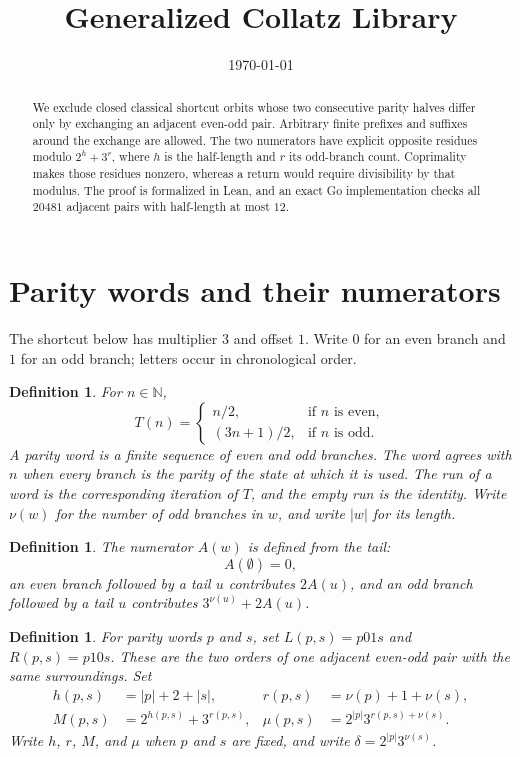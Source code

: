 \documentclass[11pt,letterpaper]{article}
\title{Generalized Collatz Library}
\author{}
\date{\today}
\newcommand{\N}{\mathbb{N}}
\newtheorem{definition}[theorem]{Definition}
\begin{document}
\maketitle

\begin{abstract}
We exclude closed classical shortcut orbits whose two consecutive parity
halves differ only by exchanging an adjacent even-odd pair. Arbitrary finite
prefixes and suffixes around the exchange are allowed. The two numerators
have explicit opposite residues modulo \(2^h+3^r\), where \(h\) is the
half-length and \(r\) its odd-branch count. Coprimality makes those residues
nonzero, whereas a return would require divisibility by that modulus. The
proof is formalized in Lean, and an exact Go implementation checks all
\(20481\) adjacent pairs with half-length at most \(12\).
\end{abstract}

\section{Parity words and their numerators}

The shortcut below has multiplier \(3\) and offset \(1\). Write \(0\) for
an even branch and \(1\) for an odd branch; letters occur in chronological
order.

\begin{definition}
For \(n\in\N\),
\[
T(n)=\begin{cases}
n/2,&\text{if \(n\) is even},\\
(3n+1)/2,&\text{if \(n\) is odd}.
\end{cases}
\]
A parity word is a finite sequence of even and odd branches. The word agrees with \(n\) when every branch is the parity of the state at which it is used. The run of a word is the corresponding iteration of \(T\), and the empty run is the identity. Write \(\nu(w)\) for the number of odd branches in \(w\), and write \(|w|\) for its length.
\end{definition}

\begin{definition}
The numerator \(A(w)\) is defined from the tail:
\[
A(\emptyset)=0,
\]
an even branch followed by a tail \(u\) contributes \(2A(u)\), and an odd branch followed by a tail \(u\) contributes \(3^{\nu(u)}+2A(u)\).
\end{definition}

\begin{definition}
For parity words \(p\) and \(s\), set \(L(p,s)=p01s\) and
\(R(p,s)=p10s\). These are the two orders of one adjacent even-odd pair
with the same surroundings. Set
\begin{align*}
h(p,s)&=|p|+2+|s|,&
r(p,s)&=\nu(p)+1+\nu(s),\\
M(p,s)&=2^{h(p,s)}+3^{r(p,s)},&
\mu(p,s)&=2^{|p|}3^{r(p,s)+\nu(s)}.
\end{align*}
Write \(h\), \(r\), \(M\), and \(\mu\) when \(p\) and \(s\) are fixed, and write \(\delta=2^{|p|}3^{\nu(s)}\).
\end{definition}
\end{document}
